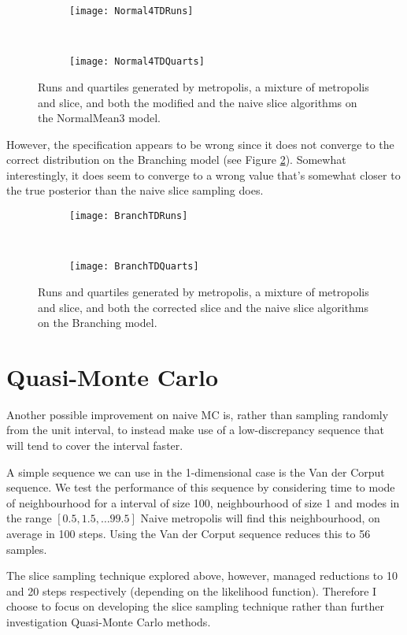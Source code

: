 \begin{figure}[h]
        \centering
        \begin{subfigure}[b]{0.48\textwidth}
                \centering
                \texttt{[image: Normal4TDRuns]}
        \end{subfigure}
        ~ 
        \begin{subfigure}[b]{0.48\textwidth}
                \centering
                \texttt{[image: Normal4TDQuarts]}
        \end{subfigure}
    \caption{Runs and quartiles generated by metropolis, a mixture of metropolis and slice, and both the modified and the naive slice algorithms on the NormalMean3 model.}
    \label{fig:normal4TD}
\end{figure}

However, the specification appears to be wrong since it does not converge to the correct distribution on the Branching model (see Figure \ref{fig:branchTD}). Somewhat interestingly, it does seem to converge to a wrong value that's somewhat closer to the true posterior than the naive slice sampling does.

\begin{figure}[h]
        \centering
        \begin{subfigure}[b]{0.48\textwidth}
                \centering
                \texttt{[image: BranchTDRuns]}
        \end{subfigure}
        ~ 
        \begin{subfigure}[b]{0.48\textwidth}
                \centering
                \texttt{[image: BranchTDQuarts]}
        \end{subfigure}
    \caption{Runs and quartiles generated by metropolis, a mixture of metropolis and slice, and both the corrected slice and the naive slice algorithms on the Branching model.}
    \label{fig:branchTD}
\end{figure}

\section{Quasi-Monte Carlo}
Another possible improvement on naive MC is, rather than sampling randomly from the unit interval, to instead make use of a low-discrepancy sequence that will tend to cover the interval faster.

A simple sequence we can use in the 1-dimensional case is the Van der Corput sequence.
We test the performance of this sequence by considering time to mode of neighbourhood for a interval of size 100, neighbourhood of size 1 and modes in the range $[0.5, 1.5, \ldots 99.5]$
Naive metropolis will find this neighbourhood, on average in 100 steps. Using the Van der Corput sequence reduces this to 56 samples. 

The slice sampling technique explored above, however,  managed reductions to 10 and 20 steps respectively (depending on the likelihood function). Therefore I choose to focus on developing the slice sampling technique rather than further investigation Quasi-Monte Carlo methods.


